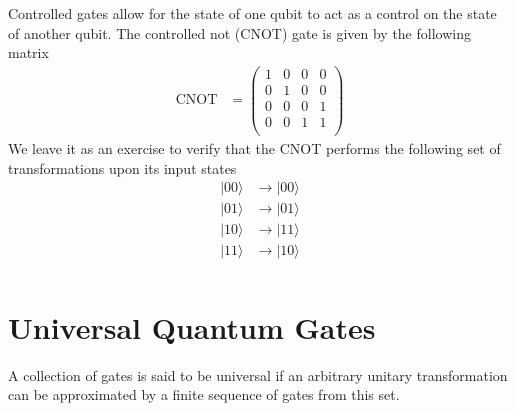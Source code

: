 \documentclass[book.tex]{subfiles}
\begin{document}
Controlled gates allow for the state of one qubit to act as a control on the state of another qubit. The controlled not (CNOT) gate is given by the following matrix
\begin{align}
    \textrm{CNOT} &= \begin{pmatrix}
    1 & 0 & 0 & 0 \\
    0 & 1 & 0 & 0 \\
    0 & 0 & 0 & 1 \\
    0 & 0 & 1 & 1 \\
    \end{pmatrix}
\end{align}
We leave it as an exercise to verify that the CNOT performs the following set of transformations upon its input states
\begin{align}
    |00 \rangle & \to | 00 \rangle \\
    |01 \rangle & \to | 01 \rangle \\
    |10 \rangle & \to | 11 \rangle \\
    |11 \rangle & \to | 10 \rangle \\
\end{align}

\section{Universal Quantum Gates}
A collection of gates is said to be universal if an arbitrary unitary transformation can be approximated by a finite sequence of gates from this set. 
\end{document}
